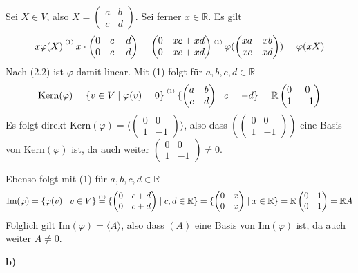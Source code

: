 \documentclass[a4paper,graphics,11pt]{article}
\newcommand{\up}[2]{\mathrel{\overset{\makebox[0pt]{\mbox{\normalfont\tiny #2}}}{#1}}}
\begin{document}
Sei $X \in V$, also
$X = \begin{pmatrix}
        a & b\\
	    c & d
    \end{pmatrix}
$. Sei ferner $x \in \mathbb{R}$. Es gilt
$$
    x\varphi(X)
    \up{=}{(1)}
    x\cdot \begin{pmatrix}
		0 & c+d\\
		0 & c+d
	\end{pmatrix}
    =
    \begin{pmatrix}
        0 & xc+xd\\
        0 & xc+xd
	\end{pmatrix}
    \up{=}{(1)}
    \varphi(
    \begin{pmatrix}
        xa & xb\\
        xc & xd
	\end{pmatrix}
    )
    =
    \varphi(xX)
$$
Nach (2.2) ist $\varphi$ damit linear.
\newpage
Mit (1) folgt für $a,b,c,d \in \mathbb{R}$
$$
    \text{Kern}(\varphi)
    = \{v \in V \mid \varphi(v) = 0\}
    \up{=}{(1)} \{\begin{pmatrix}
        a & b\\
        c & d
	\end{pmatrix}
    \mid c = -d\}
    = \mathbb{R}
    \begin{pmatrix}
        0 & 0\\
        1 & -1
	\end{pmatrix}
$$
Es folgt direkt $\text{Kern}(\varphi) = \langle
\begin{pmatrix}
    0 & 0\\
    1 & -1
\end{pmatrix}
\rangle$, also dass $(
\begin{pmatrix}
    0 & 0\\
    1 & -1
\end{pmatrix}
)$ eine Basis von $\text{Kern}(\varphi)$ ist, da auch
weiter $
\begin{pmatrix}
    0 & 0\\
    1 & -1
\end{pmatrix}
\neq 0
$.

Ebenso folgt mit (1) für $a,b,c,d \in \mathbb{R}$
$$
    \text{Im}(\varphi)
    = \{\varphi(v) \mid v \in V\}
    \up{=}{(1)} \{
    \begin{pmatrix}
        0 & c+d\\
        0 & c+d
    \end{pmatrix}
    \mid c,d \in \mathbb{R}\}
    =\{
    \begin{pmatrix}
        0 & x\\
        0 & x
    \end{pmatrix}
    \mid x \in \mathbb{R}\}
    = \mathbb{R}
    \begin{pmatrix}
        0 & 1\\
        0 & 1
    \end{pmatrix}
    = \mathbb{R}A
$$
Folglich gilt $\text{Im}(\varphi) = \langle A\rangle$, also dass $(A)$ eine Basis von $\text{Im}(\varphi)$ ist,
da auch weiter $A \neq 0$.

\textbf{b)}
\end{document}
